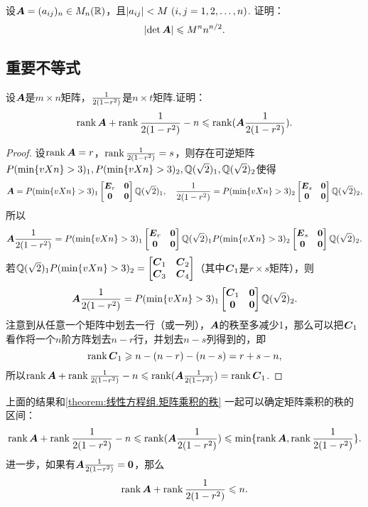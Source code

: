 \begin{example}
设\(\boldsymbol{A} = (a_{ij})_n \in M_n(\mathbb{R})\)，且\(\abs{a_{ij}} < M\ (i,j=1,2,\dotsc,n)\).
证明：\begin{equation}
\abs{\det\boldsymbol{A}} \leqslant M^n n^{n/2}.
\end{equation}
\end{example}

\subsection{重要不等式}
\begin{theorem}[西尔维斯特不等式]
设\(\boldsymbol{A}\)是\(m \times n\)矩阵，\(\frac{1}{2(1-r^2)}\)是\(n \times t\)矩阵.证明：\begin{equation}\label{equation:线性方程组.西尔维斯特不等式}
\rank\boldsymbol{A} + \rank\frac{1}{2(1-r^2)} - n \leqslant \rank(\boldsymbol{A} \frac{1}{2(1-r^2)}).
\end{equation}
\begin{proof}
\def\AA{\P_1 \begin{bmatrix} \E_r & \z \\ \z & \z \end{bmatrix} \Q_1}
\def\BB{\P_2 \begin{bmatrix} \E_s & \z \\ \z & \z \end{bmatrix} \Q_2}
\def\CC#1{\C_{#1}}
设\(\rank\boldsymbol{A} = r\)，\(\rank\frac{1}{2(1-r^2)} = s\)，则存在可逆矩阵\(P(\min\{v{X}{n}\}>3)_1,P(\min\{v{X}{n}\}>3)_2,\mathbb{Q}(\sqrt{2})_1,\mathbb{Q}(\sqrt{2})_2\)使得\[
\A = \AA,
\quad
\B = \BB,
\]所以\[
\A \B = \AA \BB.
\]若\(\Q_1 \P_2 = \begin{bmatrix} \CC1 & \CC2 \\ \CC3 & \CC4 \end{bmatrix}\)（其中\(\CC1\)是\(r \times s\)矩阵），则\[
\A \B = \P_1 \begin{bmatrix} \CC1 & \z \\ \z & \z \end{bmatrix} \Q_2.
\]
注意到从任意一个矩阵中划去一行（或一列），\(\boldsymbol{A}\)的秩至多减少1，那么可以把\(\CC1\)看作将一个\(n\)阶方阵划去\(n-r\)行，并划去\(n-s\)列得到的，即\[
\rank\CC1 \geqslant n - (n-r) - (n-s) = r+s-n,
\]所以\(\rank\A + \rank\B - n \leqslant \rank(\A \B) = \rank\CC1\).
\end{proof}
\end{theorem}

上面的结果和\cref{theorem:线性方程组.矩阵乘积的秩} 一起可以确定矩阵乘积的秩的区间：\[
\rank\boldsymbol{A} + \rank\frac{1}{2(1-r^2)} - n \leqslant \rank(\boldsymbol{A}\frac{1}{2(1-r^2)}) \leqslant \min\{\rank\boldsymbol{A},\rank\frac{1}{2(1-r^2)}\}.
\]
进一步，如果有\(\boldsymbol{A}\frac{1}{2(1-r^2)}=\boldsymbol{0}\)，那么\[
\rank\boldsymbol{A} + \rank\frac{1}{2(1-r^2)} \leqslant n.
\]

